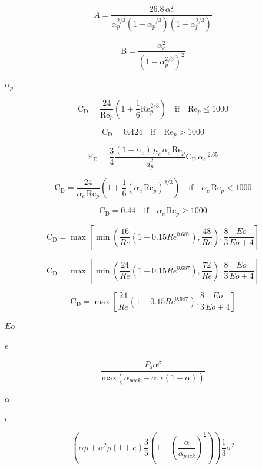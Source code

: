 \documentclass{article}
\begin{document}
\[
    A = \frac{26.8\, \alpha_c^2}
    {
        \alpha_p^{2/3}
        (1 - \alpha_p^{1/3})
        (1 - \alpha_p^{2/3})
    }
\]
\pagebreak

\[
    \mathrm{B} = \frac{\alpha_c^2}{\left( 1 - \alpha_p^{2/3} \right)^2}
\]
\pagebreak

$        \alpha_p              $
\pagebreak

\[
    \mathrm{C}_\mathrm{D} =
        \frac{24}{\mathrm{Re}_p}
        \left(1 + \frac{1}{6}\mathrm{Re}_p^{2/3} \right)
        \quad \mathrm{if} \quad \mathrm{Re}_p \leq 1000
\]
\pagebreak

\[
    \mathrm{C}_\mathrm{D} =
        0.424 \quad \mathrm{if} \quad \mathrm{Re}_p > 1000
\]
\pagebreak

\[
    \mathrm{F}_\mathrm{D} =
        \frac{3}{4}
        \frac{(1 - \alpha_c) \, \mu_c \, \alpha_c \, \mathrm{Re}_p }{d_p^2}
        \mathrm{C}_\mathrm{D} \, \alpha_c^{-2.65}
\]
\pagebreak

\[
    \mathrm{C}_\mathrm{D} =
        \frac{24}{\alpha_c \, \mathrm{Re}_p}
        \left(1 + \frac{1}{6}(\alpha_c \, \mathrm{Re}_p)^{2/3} \right)
        \quad \mathrm{if} \quad \alpha_c \, \mathrm{Re}_p < 1000
\]
\pagebreak

\[
    \mathrm{C}_\mathrm{D} =
        0.44 \quad \mathrm{if} \quad \alpha_c \, \mathrm{Re}_p \geq 1000
\]
\pagebreak

\[
    \mathrm{C}_\mathrm{D} =
        \max\left[
            \min\left(\frac{16}{Re}(1+0.15Re^{0.687}), \frac{48}{Re}\right),
            \frac{8}{3}\frac{Eo}{Eo+4}
        \right]
\]
\pagebreak

\[
    \mathrm{C}_\mathrm{D} =
        \max\left[
            \min\left(\frac{24}{Re}(1+0.15Re^{0.687}), \frac{72}{Re}\right),
            \frac{8}{3}\frac{Eo}{Eo+4}
        \right]
\]
\pagebreak

\[
    \mathrm{C}_\mathrm{D} =
        \max\left[
            \frac{24}{Re}(1+0.15Re^{0.687}),
            \frac{8}{3}\frac{Eo}{Eo+4}
        \right]
\]
\pagebreak

$        Eo       $
\pagebreak

$e$
\pagebreak

\[
    \frac{P_s \alpha^\beta}{ \mathrm{max} \left( \alpha_{pack} - \alpha ,
    \epsilon ( 1 - \alpha ) \right) }
\]
\pagebreak

$\alpha$
\pagebreak

$\epsilon$
\pagebreak

\[
    \left( \alpha \rho + \alpha^2 \rho (1 + e) \frac{3}{5}
    \left( 1 - \left( \frac{\alpha}{\alpha_{pack}} \right)^\frac{1}{3}
    \right) \right) \frac{1}{3} \sigma^2
\]
\pagebreak
\end{document}
